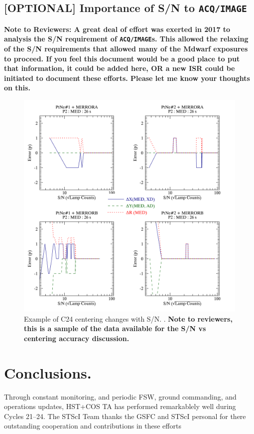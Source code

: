\documentclass{stsci_report}
\newcommand{\tacq}[1]{\texttt{ACQ/#1}}
\begin{document}
\subsection{[OPTIONAL] Importance of S/N to \tacq{IMAGE}} \label{sec:snai}
{\bf Note to Reviewers: A great deal of effort was
exerted in 2017 to analysis the S/N requirement of
\tacq{IMAGE}s. This allowed the relaxing of the S/N requirements that allowed many of the Mdwarf exposures to proceed.
If you feel this document would be a good place to put that information, it could be added here, OR
a new ISR could be initiated to document these efforts. Please let me know your thoughts on this.}
\begin{figure}[htb]
\noindent\includegraphics*[width=0.795\linewidth]{png/C24_14857_Error_vs_lampSN.png}
\caption[OPTIONAL:Example of Lamp S/N centering concerns]{Example of C24 centering changes with S/N. \label{fig:FG24e}.
{\bf Note to reviewers, this is a sample of the data available for the S/N vs centering accuracy discussion.} }
\end{figure}
\clearpage



\clearpage

\vspace{-0.3cm}
\section{Conclusions.\label{theend} }
\vspace{-0.3cm}
Through constant monitoring, and periodic FSW, ground commanding, and operations updates,
HST+COS TA has performed remarkablely well during Cycles 21--24. The STScI Team thanks the
GSFC and STScI personal for there outstanding cooperation and contributions in these efforts
\end{document}
